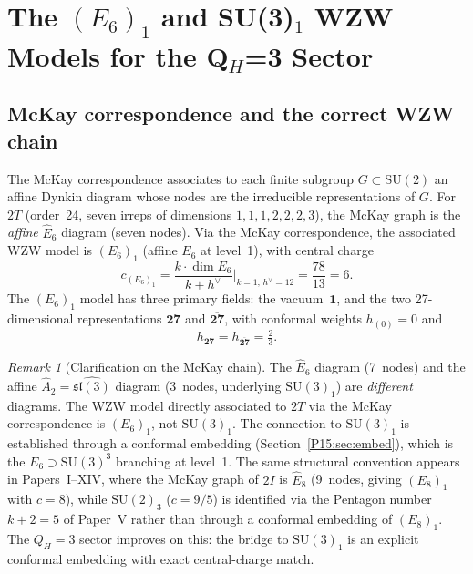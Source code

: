 \documentclass[11pt,a4paper]{article}
\theoremstyle{definition}\newtheorem{definition}[theorem]{Definition}
\theoremstyle{remark}
\newtheorem{remark}[theorem]{Remark}
\newcommand{\SU}{\mathrm{SU}}
\newcommand{\twoI}{2I}
\newcommand{\twoT}{2T}
\newcommand{\QH}{Q_H}
\begin{document}
\section{The $(E_6)_1$ and SU(3)$_1$ WZW Models for the Q$_H$=3 Sector}
\label{P15:sec:wzw}

\subsection{McKay correspondence and the correct WZW chain}

The McKay correspondence associates to each finite subgroup
$G\subset\SU(2)$ an affine Dynkin diagram whose nodes are the
irreducible representations of $G$.
For $\twoT$ (order~24, seven irreps of dimensions $1,1,1,2,2,2,3$),
the McKay graph is the \emph{affine} $\widehat{E}_6$ diagram
(seven nodes).
Via the McKay correspondence, the associated WZW model is
$(E_6)_1$ (affine $E_6$ at level~1), with central charge
\begin{equation}
  c_{(E_6)_1} = \frac{k\cdot\dim E_6}{k+h^\vee}\bigg|_{k=1,\,h^\vee=12}
  = \frac{78}{13} = 6.
  \label{P15:eq:cE6}
\end{equation}
The $(E_6)_1$ model has three primary fields:
the vacuum~$\mathbf{1}$, and the two 27-dimensional
representations $\mathbf{27}$ and $\overline{\mathbf{27}}$,
with conformal weights $h_{(0)}=0$ and
\begin{equation}
  h_{\mathbf{27}} = h_{\overline{\mathbf{27}}} = \tfrac{2}{3}.
  \label{P15:eq:h27}
\end{equation}

\begin{remark}[Clarification on the McKay chain]
\label{P15:rem:mckay_chain_clarification}
The $\widehat{E}_6$ diagram (7~nodes) and the affine
$\widehat{A}_2=\widehat{\mathfrak{sl}(3)}$ diagram (3~nodes,
underlying $\SU(3)_1$) are \emph{different} diagrams.
The WZW model directly associated to $\twoT$ via the McKay
correspondence is $(E_6)_1$, not $\SU(3)_1$.
The connection to $\SU(3)_1$ is established through a
conformal embedding (Section~\ref{P15:sec:embed}), which is
the $E_6\supset\SU(3)^3$ branching at level~1.
The same structural convention appears in Papers~I--XIV,
where the McKay graph of $\twoI$ is $\widehat{E}_8$ (9~nodes,
giving $(E_8)_1$ with $c=8$), while $\SU(2)_3$ ($c=9/5$)
is identified via the Pentagon number $k+2=5$ of Paper~V
rather than through a conformal embedding of $(E_8)_1$.
The $\QH=3$ sector improves on this: the bridge to $\SU(3)_1$
is an explicit conformal embedding with exact central-charge match.
\end{remark}
\end{document}
